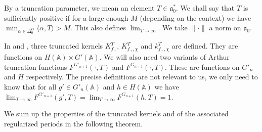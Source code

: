 \documentclass[letterpaper,11pt]{amsart}
\newcommand{\fa}{\mathfrak{a}}
\newcommand{\bA}{\mathbb{A}}
\newcommand{\<}{\negthickspace}
\providecommand{\aabs}[1]{\lVert#1\rVert}
\theoremstyle{definition}
\theoremstyle{plain}
\theoremstyle{remark}
\numberwithin{equation}{section}
\begin{document}
    By a truncation parameter, we mean an element $T \in \fa_{0}^{*}$. We shall say that $T$ is sufficiently positive if for a large enough $M$ (depending on the context) we have $\min_{\alpha \in \Delta_0^G} \langle \alpha,T \rangle >M$. This also defines $\lim_{T \to \infty}$. We take $\aabs{\cdot}$ a norm on $\fa_{0}$.

    In \cite[Section~5.3]{BLX1} and \cite[Section~5.5]{BLX1}, three truncated kernels $K_{f_+}^T$, $K_{f_+,\chi}^T$ and $k_{f_+,\chi}^T$ are defined. They are functions on $H(\bA) \times G'(\bA)$. We will also need two variants of Arthur truncation functions $F^{G'_{n+1}}(\cdot,T)$ and $F^{G_{n+1}}(\cdot,T)$. These are functions on $G'_n$ and $H$ respectively. The precise definitions are not relevant to us, we only need to know that for all $g' \in G'_n(\bA)$ and $h \in H(\bA)$ we have $\lim_{T \to \infty} F^{G'_{n+1}}(g',T)=\lim_{T \to \infty} F^{G_{n+1}}(h,T)=1$.
    
    We sum up the properties of the truncated kernels and of the associated regularized periods in the following theorem. 
\end{document}
